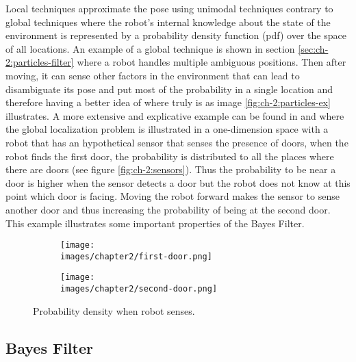 Local techniques approximate the pose using unimodal techniques contrary to global techniques where the robot’s internal knowledge about the state of the environment is represented by a probability density function (pdf) over the space of all locations\cite{Thrun:robotic-statistics}. An example of a global technique is shown in section \ref{sec:ch-2:particles-filter} where a robot handles multiple ambiguous positions. Then after moving, it can sense other factors in the environment that can lead to disambiguate its pose and put most of the probability in a single location and therefore having a better idea of where truly is as image \ref{fig:ch-2:particles-ex} illustrates. A more extensive and explicative example can be found in \cite{Thrun:robotic-statistics} and \cite{Liao:bayesian-filters} where the global localization problem is illustrated in a one-dimension space with a robot that has an hypothetical sensor that senses the presence of doors, when the robot finds the first door, the probability is distributed to all the places where there are doors (see figure \ref{fig:ch-2:sensors}). Thus the probability to be near a door is higher when the sensor detects a door but the robot does not know at this point which door is facing. Moving the robot forward makes the sensor to sense another door and thus increasing the probability of being at the second door. This example illustrates some important properties of the Bayes Filter.

\begin{figure}[h!]
  \centering
  \begin{subfigure}[b]{\linewidth}
  	\texttt{[image: \\images/chapter2/first-door.png]}
  \end{subfigure}
  \vspace{1cm}
  \begin{subfigure}[b]{\linewidth}
  	\texttt{[image: \\images/chapter2/second-door.png]}
  \end{subfigure}
  \caption{Probability density when robot senses.}
  \label{fig:ch-2:bayes-filter-example}
\end{figure}


\subsection{Bayes Filter}\label{sec:ch-2:bayes-filter}

